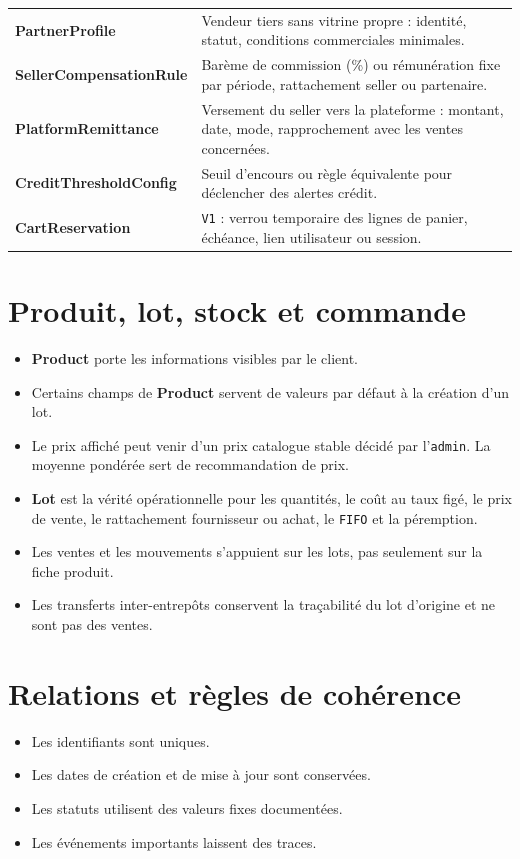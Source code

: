 \documentclass[11pt,a4paper]{scrreprt}
\newcommand{\code}[1]{\texttt{#1}}
\begin{document}
\begin{longtable}{>{\bfseries}p{4.4cm}p{9.6cm}}
PartnerProfile & Vendeur tiers sans vitrine propre : identité, statut, conditions commerciales minimales. \\
SellerCompensationRule & Barème de commission (\%) ou rémunération fixe par période, rattachement seller ou partenaire. \\
PlatformRemittance & Versement du seller vers la plateforme : montant, date, mode, rapprochement avec les ventes concernées. \\
CreditThresholdConfig & Seuil d'encours ou règle équivalente pour déclencher des alertes crédit. \\
CartReservation & \code{V1} : verrou temporaire des lignes de panier, échéance, lien utilisateur ou session. \\
\bottomrule
\end{longtable}

\section{Produit, lot, stock et commande}
\begin{itemize}
  \item \textbf{Product} porte les informations visibles par le client.
  \item Certains champs de \textbf{Product} servent de valeurs par défaut à la création d'un lot.
  \item Le prix affiché peut venir d'un prix catalogue stable décidé par l'\code{admin}. La moyenne pondérée sert de recommandation de prix.
  \item \textbf{Lot} est la vérité opérationnelle pour les quantités, le coût au taux figé, le prix de vente, le rattachement fournisseur ou achat, le \code{FIFO} et la péremption.
  \item Les ventes et les mouvements s'appuient sur les lots, pas seulement sur la fiche produit.
  \item Les transferts inter-entrepôts conservent la traçabilité du lot d'origine et ne sont pas des ventes.
\end{itemize}

\section{Relations et règles de cohérence}
\begin{itemize}
  \item Les identifiants sont uniques.
  \item Les dates de création et de mise à jour sont conservées.
  \item Les statuts utilisent des valeurs fixes documentées.
  \item Les événements importants laissent des traces.
\end{itemize}
\end{document}
